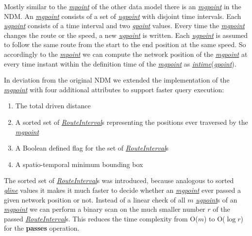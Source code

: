 \documentclass[a4paper]{article}
\newcommand{\op}[1]{\textbf{#1}}
\newcommand{\dt}[1]{\textsl{\underline{#1}}}
\begin{document}
{Mostly similar to the \dt{mpoint} of the other data model there is an
\dt{mgpoint} in the NDM. An \dt{mgpoint} consists of a set of
\dt{ugpoint} with disjoint time intervals. Each \dt{ugpoint} consists of a time
interval and two \dt{gpoint} values. Every time the \dt{mgpoint} changes the route
or the speed, a new \dt{ugpoint} is written. Each \dt{ugpoint} is assumed to follow
the same route from the start to the end position at the same speed. So accordingly
to the \dt{mpoint} we can compute the network position of the \dt{mgpoint} at every
time instant within the definition time of the \dt{mgpoint} as \dt{intime}(\dt{gpoint}).

In deviation from the original NDM we extended the implementation
of the \dt{mgpoint} with four additional attributes to support faster query execution:
\begin{enumerate}
   \item The total driven distance
   \item A sorted set of \dt{RouteInterval}s representing the positions ever
traversed by the \dt{mgpoint}
   \item A Boolean defined flag for the set of \dt{RouteInterval}s
   \item A spatio-temporal minimum bounding box
\end{enumerate}
The sorted set of \dt{RouteInterval}s was introduced, because analogous to sorted
\dt{gline} values it makes it much faster to decide whether an \dt{mgpoint} ever passed
a given network position or not. Instead of a linear check of all $m$ \dt{ugpoint}s
of an \dt{mgpoint} we can perform a binary scan on the much smaller number $r$ of
the passed \dt{RouteInterval}s.
This reduces the time complexity from O($m$) to O($\log r$) for the \op{passes}
operation.

}
\end{document}
